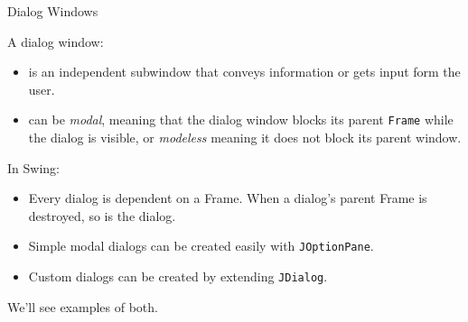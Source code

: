 \documentclass{beamer}
\begin{document}
\begin{frame}[fragile]{Dialog Windows}


A dialog window:
\begin{itemize}
\item is an independent subwindow that conveys information or gets input form the user.
\item can be {\it modal}, meaning that the dialog window blocks its parent {\tt Frame} while the dialog is visible, or {\it modeless} meaning it does not block its parent window. 
\end{itemize}
In Swing:
\begin{itemize}
\item Every dialog is dependent on a Frame.  When a dialog's parent Frame is destroyed, so is the dialog.
\item Simple modal dialogs can be created easily with {\tt JOptionPane}.
\item Custom dialogs can be created by extending {\tt JDialog}.
\end{itemize}

We'll see examples of both.

\end{frame}
\end{document}
